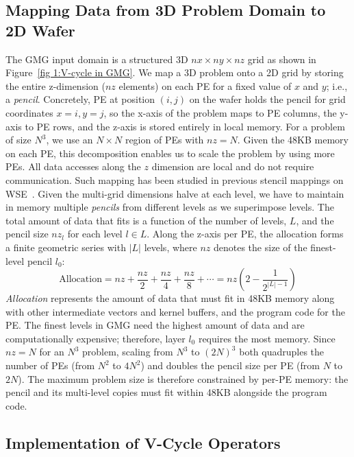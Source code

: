 \documentclass[conference]{IEEEtran}
\begin{document}
        \subsection{Mapping Data from 3D Problem Domain to 2D Wafer} \label{sec:data_layout}
            The GMG input domain is a structured 3D \(nx \times ny \times nz\) grid as shown in Figure~\ref{fig 1:V-cycle in GMG}. We map a 3D problem onto a 2D grid by storing the entire z-dimension (\(nz\) elements) on each PE for a fixed value of \(x\) and \(y\); i.e., a \textit{pencil}. Concretely, PE at position \((i,j)\) on the wafer holds the pencil for grid coordinates \(x=i, y=j\), so the x-axis of the problem maps to PE columns, the y-axis to PE rows, and the z-axis is stored entirely in local memory. For a problem of size \(N^3\), we use an \(N \times N\) region of PEs with \(nz = N\).  Given the 48KB memory on each PE, this decomposition enables us to scale the problem by using more PEs. All data accesses along the \(z\) dimension are local and do not require communication. Such mapping has been studied in previous stencil mappings on WSE~\cite{Rocki,Sai,sai2,mathias}. Given the multi-grid dimensions halve at each level, we have to maintain in memory multiple \textit{pencils} from different levels as we superimpose levels. The total amount of data that fits is a function of the number of levels, \(L\), and the pencil size \(nz_l\) for each level \(l \in L\). Along the z-axis per PE, the allocation forms a finite geometric series with \(|L|\) levels, where \(nz\) denotes the size of the finest-level pencil \(l_0\):
            \[
            \text{Allocation} = nz + \frac{nz}{2} + \frac{nz}{4} + \frac{nz}{8} + \cdots
            = nz \left( 2 - \frac{1}{2^{|L|-1}} \right)
            \]
            \textit{Allocation} represents the amount of data that must fit in 48KB memory along with other intermediate vectors and kernel buffers, and the program code for the PE.
            The finest levels in GMG need the highest amount of data and are computationally expensive; therefore, layer \(l_0\) requires the most memory.
            Since \(nz = N\) for an \(N^3\) problem, scaling from \(N^3\) to \((2N)^3\) both quadruples the number of PEs (from \(N^2\) to \(4N^2\)) and doubles the pencil size per PE (from \(N\) to \(2N\)). The maximum problem size is therefore constrained by per-PE memory: the pencil and its multi-level copies must fit within 48KB alongside the program code.

        \subsection{Implementation of V-Cycle Operators}
            \label{sec:statemachine}
\end{document}
